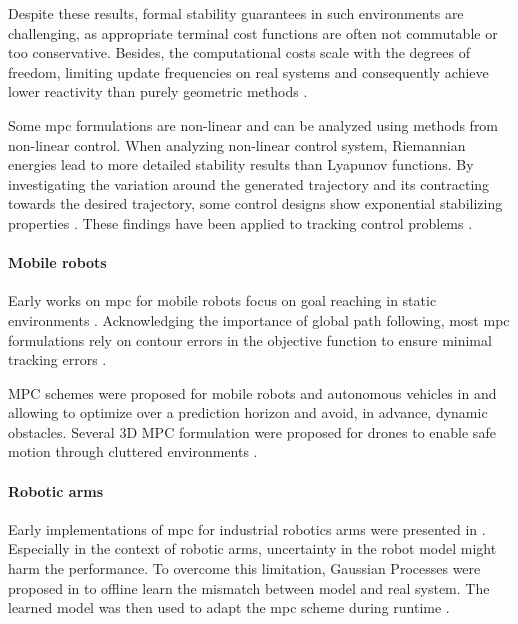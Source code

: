 Despite these results, formal stability
guarantees in such environments are challenging, as appropriate terminal cost
functions are often not commutable or too conservative. Besides, the
computational costs scale with the degrees of freedom,
limiting update frequencies on real systems
and consequently achieve lower reactivity than purely
geometric methods \cite{Spahn2021}.

Some \ac{mpc} formulations are non-linear and can be analyzed
using methods from non-linear control. When analyzing non-linear control
system, Riemannian energies lead to more detailed stability results than
Lyapunov functions. By investigating the variation around the generated
trajectory and its contracting towards the desired trajectory, some control
designs show exponential stabilizing properties \cite{l2}. These
findings have been applied to tracking control problems \cite{l3}.

\paragraph{Mobile robots}

Early works on \ac{mpc} for mobile robots focus on goal
reaching in static environments \cite{howard2010receding}.
Acknowledging the importance of global path following, most
\ac{mpc} formulations rely on contour errors in the
objective function to ensure minimal tracking errors
\cite{lam2010model,brown2017safe}.

MPC schemes were proposed for mobile robots and autonomous vehicles in
\cite{Brito2019} and \cite{Schwarting2018} allowing to optimize over a
prediction horizon and avoid, in advance, dynamic obstacles.  Several 3D MPC
formulation were proposed for drones to enable safe motion through cluttered
environments \cite{Tordesillas2019,Liu2017}.

\paragraph{Robotic arms}

Early implementations of \ac{mpc} for industrial robotics
arms were presented in \cite{faulwasser2016implementation}.
Especially in the context of robotic arms, uncertainty in
the robot model might harm the performance. To overcome this
limitation, Gaussian Processes were proposed in
\cite{hewing2019cautious,carron2019data} to offline learn
the mismatch between model and real system. The learned
model was then used to adapt the \ac{mpc} scheme during
runtime \cite{carron2019data}.


